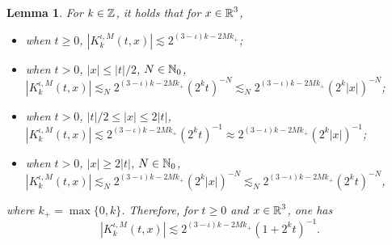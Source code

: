 \documentclass[11pt,twoside]{article}
\def\Z{\mathop{\mathbb Z\kern 0pt}\nolimits}
\def\R{\mathop{\mathbb R\kern 0pt}\nolimits}
\def\ls{\lesssim}
\theoremstyle{plain}
\newtheorem{lemma}[theorem]{Lemma}
\theoremstyle{definition}
\numberwithin{equation}{section}
\begin{document}
	\begin{lemma}\label{lem:estimate of KklM}
		For \( k \in \Z \), it holds that for $x\in \R^3$,
		\begin{itemize}
			\item[(1)] when $t\ge 0$, $|K_k^{\iota,M}(t,x)|\ls 2^{(3-\iota)k-2Mk_+}$;
			\item[(2)] when $t>0$, $|x|\le |t|/2$,  $N\in\Bbb N_0$,
			$|K_k^{\iota,M}(t,x)|\ls_N 2^{(3-\iota)k-2Mk_+}(2^kt)^{-N}\ls_N 2^{(3-\iota)k-2Mk_+}(2^k|x|)^{-N}$;
			\item[(3)] when $t>0$, $|t|/2\le |x|\le 2|t|$, $|K_k^{\iota,M}(t,x)|\ls 2^{(3-\iota)k-2Mk_+}(2^kt)^{-1}\approx 2^{(3-\iota)k-2Mk_+}(2^k|x|)^{-1}$;
			\item[(4)] when $t>0$, $|x|\ge 2|t|$, $N\in\Bbb N_0$,
			$|K_k^{\iota,M}(t,x)|\ls_N 2^{(3-\iota)k-2Mk_+}(2^k|x|)^{-N}\ls_N 2^{(3-\iota)k-2Mk_+}(2^kt)^{-N}$,
		\end{itemize}
		where $k_+=\max\{0,k\}$. Therefore, for $t\ge0$ and $x\in\R^3$, one has
		\begin{equation}\label{ineq:estimate of KklM}
			|K_k^{\iota,M}(t,x)|\ls 2^{(3-\iota)k-2Mk_+}(1+2^kt)^{-1}.
		\end{equation}
	\end{lemma}
\end{document}
